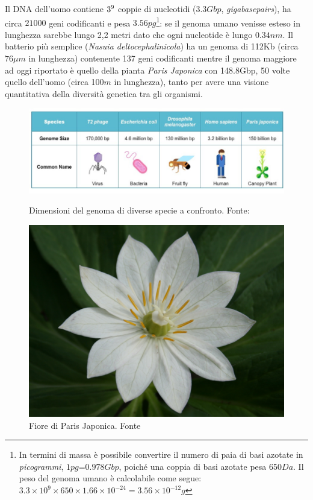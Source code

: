 \par Il DNA dell'uomo contiene $3\time10^{9}$ coppie di nucleotidi ($3.3Gbp$, \textit{gigabasepairs}), ha circa $21000$ geni codificanti e pesa $3.56pg$\footnote{In termini di massa è possibile convertire il numero di paia di basi azotate in \textit{picogrammi}, $1pg$=$0.978Gbp$, poiché una coppia di basi azotate pesa 650$Da$. Il peso del genoma umano è calcolabile come segue: $3.3\times10^{9}\times650\times1.66\times10^{-24}=3.56\times10^{-12}g$}: se il genoma umano venisse esteso in lunghezza sarebbe lungo 2,2 metri dato che ogni nucleotide è lungo $0.34nm$. Il batterio più semplice (\textit{Nasuia deltocephalinicola}) ha un genoma di 112Kb\supercite{nasuiaWiki} (circa $76\mu m$ in lunghezza) contenente 137 geni codificanti mentre il genoma maggiore ad oggi riportato è quello della pianta \textit{Paris Japonica} con 148.8Gbp\supercite{hidalgo2017there}, 50 volte quello dell'uomo (circa 100$m$ in lunghezza), tanto per avere una visione quantitativa della diversità genetica tra gli organismi.

\begin{figure}[!htb]
	\centering
	\includegraphics[scale=0.35]{images/genome-size-table_med.jpeg}
	\caption{Dimensioni del genoma di diverse specie a confronto. Fonte: \cite{genomeSizeBioNinja}}
	\label{fig:genome-size}
	\endminipage\hfill
	\centering
	\includegraphics[scale=0.1]{images/Paris-japonica.jpg}
	\caption{Fiore di Paris Japonica. Fonte \cite{Pariswiki}}
	\label{fig:paris-japonica}
	\endminipage\hfill
\end{figure}

